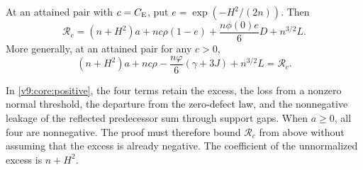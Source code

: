 \begin{theorem}\label{revision:contact-conservation}
At an attained pair with $c=C_{\mathrm E}$, put $e=\exp(-H^2/(2n))$. Then
\begin{equation}\label{v9:core:positive}
 \mathcal R_c=(n+H^2)a+nc\rho(1-e)+\frac{n\phi(0)e}{6}D+n^{3/2}L.
\end{equation}
More generally, at an attained pair for any $c>0$,
\begin{equation}\label{v9:core:conservation}
 (n+H^2)a+nc\rho-\frac{n\varphi}{6}(\gamma+3J)+n^{3/2}L=\mathcal R_c.
\end{equation}
\end{theorem}
In \eqref{v9:core:positive}, the four terms retain the excess, the loss
from a nonzero normal threshold, the departure from the zero-defect law,
and the nonnegative leakage of the reflected predecessor sum through
support gaps. When $a\ge0$, all four are nonnegative. The proof must
therefore bound $\mathcal R_c$ from above without assuming that the
excess is already negative. The coefficient of the unnormalized excess
is $n+H^2$.

